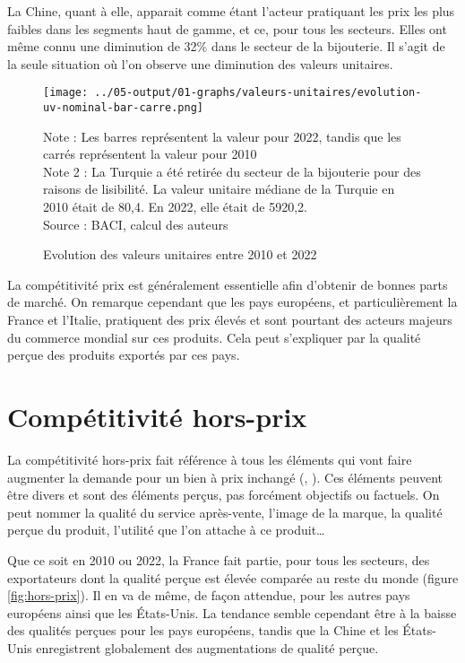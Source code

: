 \documentclass[french,10pt,a4paper]{article}
\begin{document}
La Chine, quant à elle, apparait comme étant l'acteur pratiquant les prix les plus faibles dans les segments haut de gamme, et ce, pour tous les secteurs. Elles ont même connu une diminution de 32\% dans le secteur de la bijouterie. Il s'agit de la seule situation où l'on observe une diminution des valeurs unitaires.

\begin{figure}[!h]
  \centering
  \texttt{[image: ../05-output/01-graphs/valeurs-unitaires/evolution-uv-nominal-bar-carre.png]}
  \captionsetup{justification=justified, singlelinecheck=false, font=small}
  \caption*{Note : Les barres représentent la valeur pour 2022, tandis que les carrés représentent la valeur pour 2010 \\
  Note 2 : La Turquie a été retirée du secteur de la bijouterie pour des raisons de lisibilité. La valeur unitaire médiane de la Turquie en 2010 était de 80,4. En 2022, elle était de 5920,2. \\
  Source : BACI, calcul des auteurs}
  \captionsetup{justification=centering, singlelinecheck=true, font=normalsize}
  \caption{Evolution des valeurs unitaires entre 2010 et 2022}
  \label{fig:valeurs-unitaires}
\end{figure}

La compétitivité prix est généralement essentielle afin d'obtenir de bonnes parts de marché. On remarque cependant que les pays européens, et particulièrement la France et l'Italie, pratiquent des prix élevés et sont pourtant des acteurs majeurs du commerce mondial sur ces produits. Cela peut s'expliquer par la qualité perçue des produits exportés par ces pays.

\section{Compétitivité hors-prix}
La compétitivité hors-prix fait référence à tous les éléments qui vont faire augmenter la demande pour un bien à prix inchangé (\cite{Khandelwal2013}, \cite{Bas2015}). Ces éléments peuvent être divers et sont des éléments perçus, pas forcément objectifs ou factuels. On peut nommer la qualité du service après-vente, l'image de la marque, la qualité perçue du produit, l'utilité que l'on attache à ce produit…

Que ce soit en 2010 ou 2022, la France fait partie, pour tous les secteurs, des exportateurs dont la qualité perçue est élevée comparée au reste du monde (figure \ref{fig:hors-prix}). Il en va de même, de façon attendue, pour les autres pays européens ainsi que les États-Unis. La tendance semble cependant être à la baisse des qualités perçues pour les pays européens, tandis que la Chine et les États-Unis enregistrent globalement des augmentations de qualité perçue.
\end{document}
